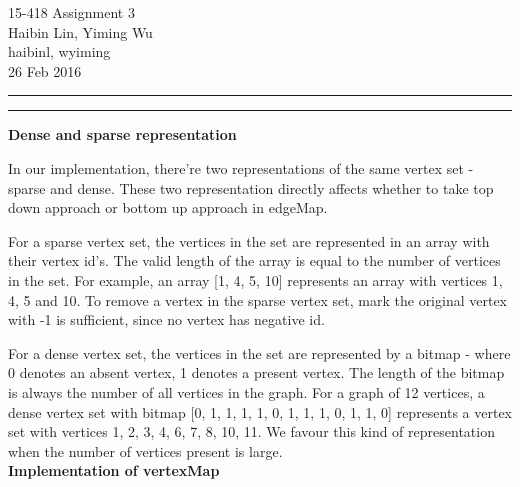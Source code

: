 \documentclass[11pt]{article}
\newcommand{\question}[2] {\vspace{.25in} \hrule\vspace{0.5em}
\noindent{\bf #1: #2} \vspace{0.5em}
\hrule \vspace{.10in}}
\newcommand{\myhwnum}{3}
\newcommand{\myname}{Haibin Lin, Yiming Wu}
\newcommand{\myandrew}{haibinl, wyiming}
\begin{document}
\medskip                  %

\thispagestyle{plain}
\begin{center}                  %
{\Large 15-418 Assignment \myhwnum} \\
\myname \\
\myandrew \\
26 Feb 2016 \\
\end{center}

\question{Parallel Graph}{Writeup}


\textbf{Dense and sparse representation}

In our implementation, there're two representations of the same vertex set - sparse and dense. These two representation directly affects whether to take top down approach or bottom up approach in edgeMap. 

For a sparse vertex set, the vertices in the set are represented in an array with their vertex id's. The valid length of the array is equal to the number of vertices in the set. For example, an array [1, 4, 5, 10] represents an array with vertices 1, 4, 5 and 10. To remove a vertex in the sparse vertex set, mark the original vertex with -1 is sufficient, since no vertex has negative id. 

For a dense vertex set, the vertices in the set are represented by a bitmap - where 0 denotes an absent vertex, 1 denotes a present vertex. The length of the bitmap is always the number of all vertices in the graph. For a graph of 12 vertices, a dense vertex set with bitmap [0, 1, 1, 1, 1, 0, 1, 1, 1, 0, 1, 1, 0] represents a vertex set with vertices 1, 2, 3, 4, 6, 7, 8, 10, 11. We favour this kind of representation when the number of vertices present is large. \\

\textbf{Implementation of vertexMap}
\end{document}
